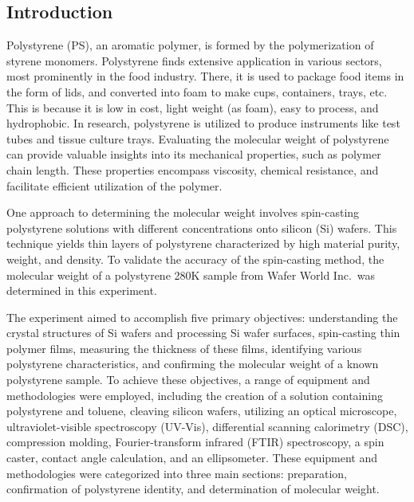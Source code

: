 \documentclass{article}
\begin{document}
    \begin{multicols}{2}
        \section{Introduction}
        Polystyrene (PS), an aromatic polymer, is formed by the polymerization of styrene monomers\autocite{WOS:Weith}. Polystyrene finds extensive application in various sectors, most prominently in the food industry\autocite{WOS:Paraskevopoulou}. There, it is used to package food items in the form of lids, and converted into foam to make cups, containers, trays, etc. This is because it is low in cost, light weight (as foam), easy to process, and hydrophobic\autocite{WOS:He}. In research, polystyrene is utilized to produce instruments like test tubes and tissue culture trays. Evaluating the molecular weight of polystyrene can provide valuable insights into its mechanical properties, such as polymer chain length\autocite{WOS:Smirnova}. These properties encompass viscosity\autocite{WOS:Tang}, chemical resistance\autocite{WOS:Feng}, and facilitate efficient utilization of the polymer\autocite{WOS:Ismail, WOS:Zizkova, WOS:Siswosukarto, WOS:Motta}.

        One approach to determining the molecular weight involves spin-casting polystyrene solutions with different concentrations onto silicon (Si) wafers. This technique yields thin layers of polystyrene characterized by high material purity, weight, and density\autocite{WOS:Dinelli}. To validate the accuracy of the spin-casting method, the molecular weight of a polystyrene 280K sample from Wafer World Inc.\ was determined in this experiment.
        
        The experiment aimed to accomplish five primary objectives: understanding the crystal structures of Si wafers and processing Si wafer surfaces, spin-casting thin polymer films, measuring the thickness of these films, identifying various polystyrene characteristics, and confirming the molecular weight of a known polystyrene sample. To achieve these objectives, a range of equipment and methodologies were employed, including the creation of a solution containing polystyrene and toluene, cleaving silicon wafers, utilizing an optical microscope, ultraviolet-visible spectroscopy (UV-Vis), differential scanning calorimetry (DSC), compression molding, Fourier-transform infrared (FTIR) spectroscopy, a spin caster, contact angle calculation, and an ellipsometer. These equipment and methodologies were categorized into three main sections: preparation, confirmation of polystyrene identity, and determination of molecular weight. 


\end{multicols}
\end{document}

